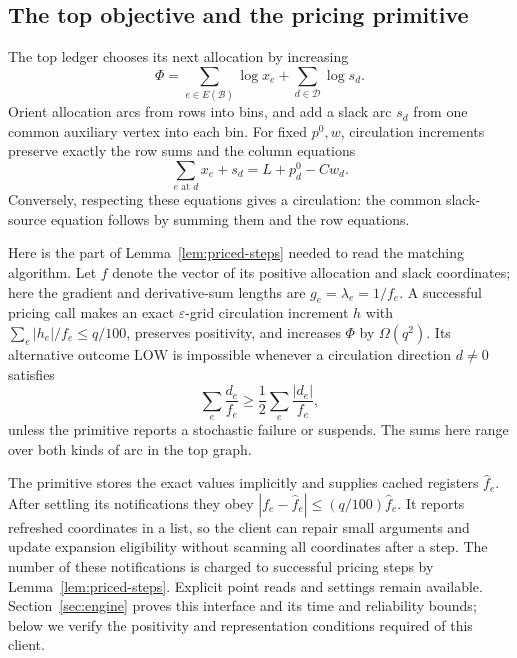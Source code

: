 \subsection{The top objective and the pricing primitive}

The top ledger chooses its next allocation by increasing
\begin{equation}
             \Phi=\sum_{e\in E(\mathcal B)}\log x_e+
                         \sum_{d\in\mathcal D}\log s_d.
 \label{match:top-objective}
\end{equation}
Orient allocation arcs from rows into bins, and add a slack arc
\(s_d\) from one common auxiliary vertex into each bin.
For fixed \(p^0,w\), circulation increments preserve exactly the
row sums and the column equations
\[
                 \sum_{e\text{ at }d}x_e+s_d=L+p^0_d-Cw_d.
\]
Conversely, respecting these equations gives a circulation:
the common slack-source equation follows by summing them and the
row equations.

Here is the part of Lemma~\ref{lem:priced-steps} needed to read the
matching algorithm.  Let \(f\) denote the vector of its positive
allocation and slack coordinates; here the gradient and derivative-sum
lengths are \(g_e=\lambda_e=1/f_e\).  A successful pricing call makes
an exact \(\varepsilon\)-grid circulation increment \(h\) with
\(\sum_e |h_e|/f_e\le q/100\), preserves positivity, and increases
\(\Phi\) by \(\Omega(q^2)\).  Its alternative outcome
\(\mathrm{LOW}\) is impossible whenever a circulation direction
\(d\ne0\) satisfies
\[
                  \sum_e\frac{d_e}{f_e}
                     \ge\frac12\sum_e\frac{|d_e|}{f_e},
\]
unless the primitive reports a stochastic failure or suspends.
The sums here range over both kinds of arc in the top graph.

The primitive stores the exact values implicitly and supplies cached
registers \(\widehat f_e\).  After settling its notifications they obey
\( |f_e-\widehat f_e|\le(q/100)\widehat f_e\).
It reports refreshed coordinates in a list, so the client can repair
small arguments and update expansion eligibility without scanning all
coordinates after a step.  The number of these notifications is charged
to successful pricing steps by Lemma~\ref{lem:priced-steps}.
Explicit point reads and settings remain available.  Section~\ref{sec:engine}
proves this interface and its time and reliability bounds; below we verify
the positivity and representation conditions required of this client.

